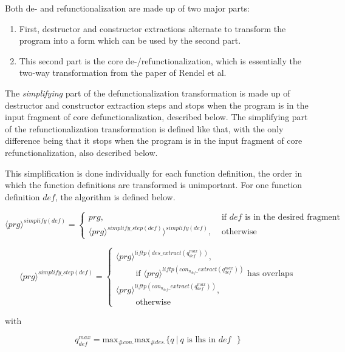 Both de- and refunctionalization are made up of two major parts:
\begin{enumerate}
\item First, destructor and constructor extractions alternate to transform the program into a form which can be used by the second part.

\item This second part is the core de-/refunctionalization, which is essentially the two-way transformation from the paper of Rendel et al.
\end{enumerate}

The \textit{simplifying} part of the defunctionalization transformation is made up of destructor and constructor extraction steps and stops when the program is in the input fragment of core defunctionalization, described below. The simplifying part of the refunctionalization transformation is defined like that, with the only difference being that it stops when the program is in the input fragment of core refunctionalization, also described below.

This simplification is done individually for each function definition, the order in which the function definitions are transformed is unimportant. For one function definition $def$, the algorithm is defined below.

\[
  \langle prg \rangle^{simplify(def)}=\begin{cases}
               prg, &\text{ if $def$ is in the desired fragment}\\
               \langle prg \rangle^{simplify\_step(def)} \rangle^{simplify(def)}, &\text{ otherwise}
            \end{cases}
\]

\[
  \langle prg \rangle^{simplify\_step(def)}=\begin{cases}
               \langle prg \rangle^{liftp(des\_extract(q^{max}_{def}))}, \\
               \qquad\text{ if } \langle prg \rangle^{liftp(con_{n_{def}}\_extract(q^{max}_{def}))} \text{ has overlaps}\\
               \langle prg \rangle^{liftp(con_{n_{def}}\_extract(q^{max}_{def}))},\\
               \qquad\text{ otherwise}
            \end{cases}
\]

with

\[
q^{max}_{def} = \textrm{max}_{\# con.} \textrm{max}_{\# des.} \{q ~ | ~ q \text{ is lhs in $def$ } \}
\]

